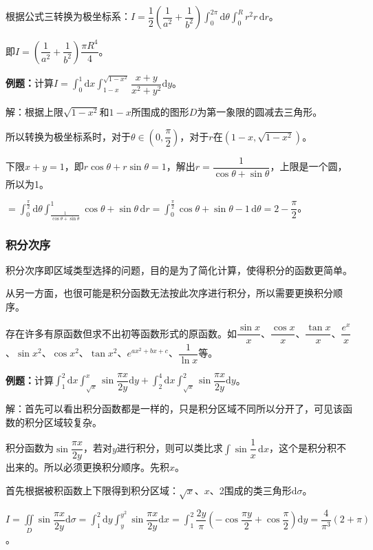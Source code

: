 \documentclass[UTF8, 12pt]{ctexart}
\begin{document}
根据公式三转换为极坐标系：$I=\dfrac{1}{2}\left(\dfrac{1}{a^2}+\dfrac{1}{b^2}\right)\int_0^{2\pi}\textrm{d}\theta\int_0^Rr^2r\,\textrm{d}r$。

即$I=\left(\dfrac{1}{a^2}+\dfrac{1}{b^2}\right)\dfrac{\pi R^4}{4}$。

\textbf{例题：}计算$I=\int_0^1\textrm{d}x\int_{1-x}^{\sqrt{1-x^2}}\dfrac{x+y}{x^2+y^2}\textrm{d}y$。

解：根据上限$\sqrt{1-x^2}$和$1-x$所围成的图形$D$为第一象限的圆减去三角形。

所以转换为极坐标系时，对于$\theta\in\left(0,\dfrac{\pi}{2}\right)$，对于$r$在$(1-x,\sqrt{1-x^2})$。

下限$x+y=1$，即$r\cos\theta+r\sin\theta=1$，解出$r=\dfrac{1}{\cos\theta+\sin\theta}$，上限是一个圆，所以为1。

$=\int_0^\frac{\pi}{2}\textrm{d}\theta\int_\frac{1}{\cos\theta+\sin\theta}^1\cos\theta+\sin\theta\,\textrm{d}r=\int_0^\frac{\pi}{2}\cos\theta+\sin\theta-1\,\textrm{d}\theta=2-\dfrac{\pi}{2}$。

\subsubsection{积分次序}

积分次序即区域类型选择的问题，目的是为了简化计算，使得积分的函数更简单。

从另一方面，也很可能是积分函数无法按此次序进行积分，所以需要更换积分顺序。

存在许多有原函数但求不出初等函数形式的原函数。如$\dfrac{\sin x}{x}$、$\dfrac{\cos x}{x}$、$\dfrac{\tan x}{x}$、$\dfrac{e^x}{x}$、$\sin x^2$、$\cos x^2$、$\tan x^2$、$e^{ax^2+bx+c}$、$\dfrac{1}{\ln x}$等。

\textbf{例题：}计算$\displaystyle{\int_1^2\textrm{d}x\int_{\sqrt{x}}^x\sin\dfrac{\pi x}{2y}\textrm{d}y+\int_2^4\textrm{d}x\int_{\sqrt{x}}^2\sin\dfrac{\pi x}{2y}\textrm{d}y}$。

解：首先可以看出积分函数都是一样的，只是积分区域不同所以分开了，可见该函数的积分区域较复杂。

积分函数为$\sin\dfrac{\pi x}{2y}$，若对$y$进行积分，则可以类比求$\displaystyle{\int\sin\dfrac{1}{x}\,\textrm{d}x}$，这个是积分积不出来的。所以必须更换积分顺序。先积$x$。

首先根据被积函数上下限得到积分区域：$\sqrt{x}$、$x$、2围成的类三角形$\textrm{d}\sigma$。

$I=\displaystyle{\iint\limits_D\sin\dfrac{\pi x}{2y}\textrm{d}\sigma}=\displaystyle{\int_1^2\textrm{d}y\int_y^{y^2}\sin\dfrac{\pi x}{2y}\textrm{d}x}=\displaystyle{\int_1^2\dfrac{2y}{\pi}\left(-\cos\dfrac{\pi y}{2}+\cos\dfrac{\pi}{2}\right)}\textrm{d}y=\dfrac{4}{\pi^3}(2+\pi)$。
\end{document}

